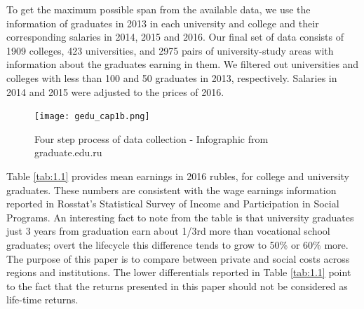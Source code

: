 \documentclass[alpha-refs]{wiley-article-05g}
\begin{document}
\vspace{0.5em}

To get the maximum possible span from the available data,  we use the information of graduates in 2013 in each university and college and their corresponding salaries in 2014, 2015 and 2016. Our final set of data consists of 1909 colleges, 423 universities, and 2975 pairs of university-study areas with information about the graduates earning in them. We filtered out universities and colleges with less than 100 and 50 graduates in 2013, respectively. Salaries in 2014 and 2015 were adjusted to the prices of 2016. 

\begin{center}
	\begin{figure}[htbp!]
\begin{minipage}[b]{1\linewidth}
			\centering
			\hspace*{-0.2in}
         \texttt{[image: gedu\_cap1b.png]}
		\end{minipage}
			\caption{Four step process of data collection - Infographic from graduate.edu.ru}\label{fig:1.1}
	\end{figure}
\end{center}

\vspace{-0.35in}

Table \ref{tab:1.1} provides mean earnings in 2016 rubles, for college and university graduates. These numbers are consistent with the wage earnings information reported in Rosstat's Statistical Survey of Income and Participation in Social Programs. An interesting fact to note from the table is that university graduates just 3 years from graduation earn about 1/3rd more than vocational school graduates; overt the lifecycle this difference tends to grow to 50\% or 60\% more. The purpose of this paper is to compare between private and social costs across regions and institutions. The lower differentials reported in Table \ref{tab:1.1} point to the fact that the returns presented in this paper should not be considered as life-time returns. 
\end{document}
